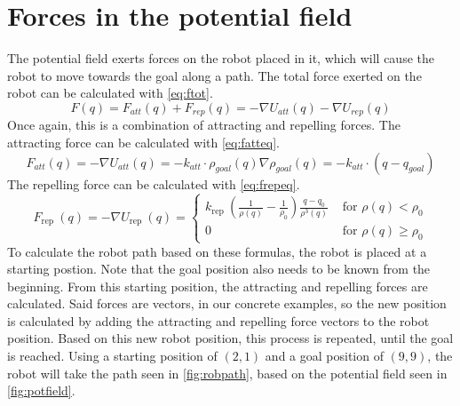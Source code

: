 \documentclass[11pt]{article}
\begin{document}
    \section{Forces in the potential field}\label{sec:forcesinfield}
    The potential field exerts forces on the robot placed in it, which will cause the robot to move towards the goal along a path.
    The total force exerted on the robot can be calculated with \autoref{eq:ftot}.
    \begin{equation}\label{eq:ftot}
        F(q)=F_{a t t}(q)+F_{r e p}(q)=-\nabla U_{a t t}(q)-\nabla U_{r e p}(q)
    \end{equation}
    Once again, this is a combination of attracting and repelling forces.
    The attracting force can be calculated with \autoref{eq:fatteq}.
    \begin{equation}\label{eq:fatteq}
        F_{a t t}(q)=-\nabla U_{a t t}(q)=-k_{a t t} \cdot \rho_{g o a l}(q) \nabla \rho_{g o a l}(q)=-k_{a t t} \cdot\left(q-q_{g o a l}\right)
    \end{equation}
    The repelling force can be calculated with \autoref{eq:frepeq}.
    \begin{equation}\label{eq:frepeq}
        F_{\text {rep }}(q)=-\nabla U_{\text {rep }}(q)=\left\{\begin{array}{ll}
                                                                   k_{\text {rep }}\left(\frac{1}{\rho(q)}-\frac{1}{\rho_{0}}\right) \frac{q-q_{0}}{\rho^{3}(q)} & \text { for } \rho(q)<\rho_{0} \\
                                                                   0 & \text { for } \rho(q) \geq \rho_{0}
        \end{array}\right.
    \end{equation}
    To calculate the robot path based on these formulas, the robot is placed at a starting postion.
    Note that the goal position also needs to be known from the beginning.
    From this starting position, the attracting and repelling forces are calculated.
    Said forces are vectors, in our concrete examples, so the new position is calculated by adding the attracting and repelling force vectors to the robot position.
    Based on this new robot position, this process is repeated, until the goal is reached.
    Using a starting position of $\left( 2, 1 \right)$ and a goal position of $\left( 9, 9 \right)$, the robot will take the path seen in \autoref{fig:robpath}, based on the potential field seen in \autoref{fig:potfield}.
\end{document}
